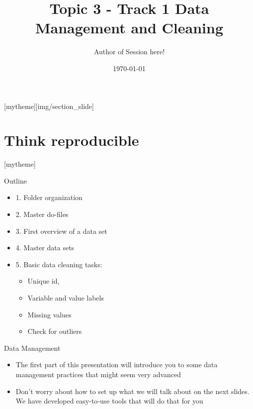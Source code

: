 \documentclass[aspectratio=169]{beamer}
\title{Topic 3 - Track 1 \newline Data Management and Cleaning}
\date{\today}
\author{Author of Session here!} %
\institute{Development Impact Evaluation (DIME) \newline The World Bank }
\newcommand{\sectionpic}[2]{
	\setbeamertemplate{section page}[mytheme][#2]
	\section{#1}
	\setbeamertemplate{section page}[mytheme]
}
\begin{document}
	
{
	\maketitle
}

\sectionpic{Think reproducible}{img/section_slide}


\begin{frame}{Outline}
	\begin{itemize}
		\item 1. Folder organization
		\item 2. Master do-files
		\item 3. First overview of a data set
		\item 4. Master data sets
		\item 5. Basic data cleaning tasks:
			\begin{itemize}
				\item Unique id, 
				\item Variable and value labels
				\item Missing values
				\item Check for outliers
			\end{itemize}		
	\end{itemize}
\end{frame}


\begin{frame}{Data Management}

\begin{itemize}
	\item The first part of this presentation will introduce you to some data management practices that might seem very advanced
	\item Don’t worry about how to set up what we will talk about on the next slides. We have developed easy-to-use tools that will do that for you
\end{itemize}
\end{frame}
\end{document}
